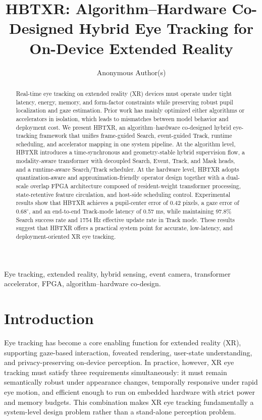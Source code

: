 \documentclass[journal]{IEEEtran}
\title{HBTXR: Algorithm--Hardware Co-Designed Hybrid Eye Tracking for On-Device Extended Reality}
\author{Anonymous Author(s)}
\begin{document}
\maketitle

\begin{abstract}
Real-time eye tracking on extended reality (XR) devices must operate under tight latency, energy, memory, and form-factor constraints while preserving robust pupil localization and gaze estimation. Prior work has mainly optimized either algorithms or accelerators in isolation, which leads to mismatches between model behavior and deployment cost. We present HBTXR, an algorithm--hardware co-designed hybrid eye-tracking framework that unifies frame-guided Search, event-guided Track, runtime scheduling, and accelerator mapping in one system pipeline. At the algorithm level, HBTXR introduces a time-synchronous and geometry-stable hybrid supervision flow, a modality-aware transformer with decoupled Search, Event, Track, and Mask heads, and a runtime-aware Search/Track scheduler. At the hardware level, HBTXR adopts quantization-aware and approximation-friendly operator design together with a dual-scale overlap FPGA architecture composed of resident-weight transformer processing, state-retentive feature circulation, and host-side scheduling control. Experimental results show that HBTXR achieves a pupil-center error of 0.42 pixels, a gaze error of $0.68^{\circ}$, and an end-to-end Track-mode latency of 0.57 ms, while maintaining 97.8\% Search success rate and 1754 Hz effective update rate in Track mode. These results suggest that HBTXR offers a practical system point for accurate, low-latency, and deployment-oriented XR eye tracking.
\end{abstract}

\begin{IEEEkeywords}
Eye tracking, extended reality, hybrid sensing, event camera, transformer accelerator, FPGA, algorithm--hardware co-design.
\end{IEEEkeywords}

\section{Introduction}
Eye tracking has become a core enabling function for extended reality (XR), supporting gaze-based interaction, foveated rendering, user-state understanding, and privacy-preserving on-device perception. In practice, however, XR eye tracking must satisfy three requirements simultaneously: it must remain semantically robust under appearance changes, temporally responsive under rapid eye motion, and efficient enough to run on embedded hardware with strict power and memory budgets. This combination makes XR eye tracking fundamentally a system-level design problem rather than a stand-alone perception problem.
\end{document}
